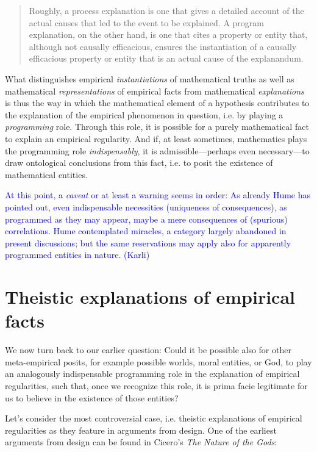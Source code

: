 \documentclass[a4paper,12pt]{article}
\newcommand{\karli}[1]{\textcolor{blue}{#1 (Karli)}}
\begin{document}
\blockquote{Roughly, a process explanation is one that gives a detailed account of the actual causes that led to the event to be explained. A program explanation, on the other hand, is one that cites a property or entity that, although not causally efficacious, ensures the instantiation of a causally efficacious property or entity that is an actual cause of the explanandum. \cite[p.~565f]{Lyon2012}}

What distinguishes empirical \textit{instantiations} of mathematical truths as well as mathematical \textit{representations} of empirical facts from mathematical \textit{explanations} is thus the way in which the mathematical element of a hypothesis contributes to the explanation of the empirical phenomenon in question, i.e. by playing a \textit{programming} role. Through this role, it is possible for a purely mathematical fact to explain an empirical regularity. And if, at least sometimes, mathematics plays the programming role \textit{indispensably}, it is admissible---perhaps even necessary---to draw ontological conclusions from this fact, i.e. to posit the existence of mathematical entities.

\karli{At this point, a {\it caveat} or at least a warning seems in order:
As already Hume has pointed out, even indispensable necessities (uniqueness of consequences), as programmed as they may appear,
maybe a mere consequences of (spurious) correlations.
Hume contemplated miracles, a category largely abandoned in present discussions;
but the same reservations may apply also for apparently programmed entities in nature.
}

\section{Theistic explanations of empirical facts}

We now turn back to our earlier question: Could it be possible also for other meta-empirical posits, for example possible worlds, moral entities, or God, to play an analogously indispensable programming role in the explanation of empirical regularities, such that, once we recognize this role, it is prima facie legitimate for us to believe in the existence of those entities?

Let's consider the most controversial case, i.e. theistic explanations of empirical regularities as they feature in arguments from design. One of the earliest arguments from design can be found in Cicero's \textit{The Nature of the Gods}:
\end{document}
